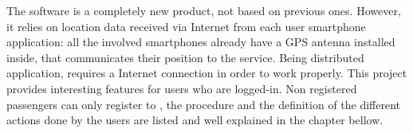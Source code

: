 The software \PowerEnJoy is a completely new product, not based on previous ones. However, it relies on location data received via Internet from each user smartphone application: all the involved smartphones already have a GPS antenna installed inside, that communicates their position to the service. Being distributed application, \PowerEnJoy requires a Internet connection in order to work properly.  This project provides interesting features for users who are logged-in. Non registered passengers can only register to \PowerEnJoy, the procedure and the definition of the different actions done by the users are listed and well explained in the chapter bellow.